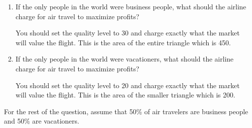 \documentclass[12pt]{article}
\newcounter{question}[section]
\newenvironment{subquestions}{
  \begin{enumerate}[label=(\roman*)]}{\end{enumerate}}
\begin{document}
\begin{subquestions}
  \item If the only people in the world were business people, what should the airline charge for air travel to maximize profits?

    \textcolor{solution-color}{
      You should set the quality level to 30 and charge exactly what the market will value the flight. This is the area of the entire triangle which is 450.
    }
  \item If the only people in the world were vacationers, what should the airline charge for air travel to maximize profits?

    \textcolor{solution-color}{
      You should set the quality level to 20 and charge exactly what the market will value the flight. This is the area of the smaller triangle which is 200.
    }
\end{subquestions}
For the rest of the question, assume that 50\% of air travelers are business
people and 50\% are vacationers.
\end{document}

